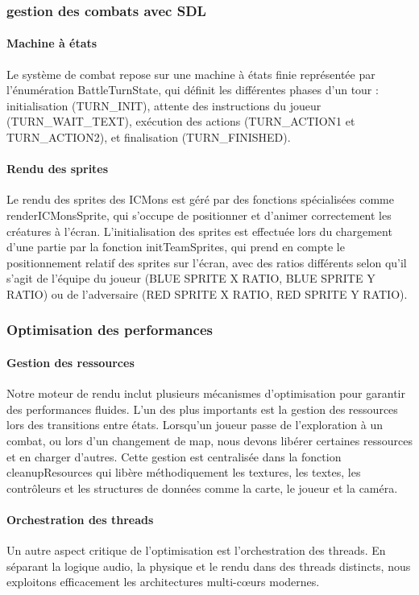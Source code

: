 \documentclass[12pt,a4paper, twoside]{article}
\begin{document}
\subsubsection{gestion des combats avec SDL}
\paragraph{Machine à états} Le système de combat repose sur une machine à états finie représentée par l'énumération BattleTurnState, qui définit les différentes phases d'un tour : initialisation (TURN\_INIT), attente des instructions du joueur (TURN\_WAIT\_TEXT), exécution des actions (TURN\_ACTION1 et TURN\_ACTION2), et finalisation (TURN\_FINISHED).

\paragraph{Rendu des sprites} Le rendu des sprites des ICMons est géré par des fonctions spécialisées comme renderICMonsSprite, qui s'occupe de positionner et d'animer correctement les créatures à l'écran. L'initialisation des sprites est effectuée lors du chargement d'une partie par la fonction initTeamSprites, qui prend en compte le positionnement relatif des sprites sur l'écran, avec des ratios différents selon qu'il s'agit de l'équipe du joueur (BLUE SPRITE X RATIO, BLUE SPRITE Y RATIO) ou de l'adversaire (RED SPRITE X RATIO, RED SPRITE Y RATIO).

\subsubsection{Optimisation des performances}
\paragraph{Gestion des ressources} Notre moteur de rendu inclut plusieurs mécanismes d'optimisation pour garantir des performances fluides. L'un des plus importants est la gestion des ressources lors des transitions entre états. Lorsqu'un joueur passe de l'exploration à un combat, ou lors d'un changement de map, nous devons libérer certaines ressources et en charger d'autres. Cette gestion est centralisée dans la fonction cleanupResources qui libère méthodiquement les textures, les textes, les contrôleurs et les structures de données comme la carte, le joueur et la caméra.

\paragraph{Orchestration des threads} Un autre aspect critique de l'optimisation est l'orchestration des threads. En séparant la logique audio, la physique et le rendu dans des threads distincts, nous exploitons efficacement les architectures multi-cœurs modernes.
\end{document}
